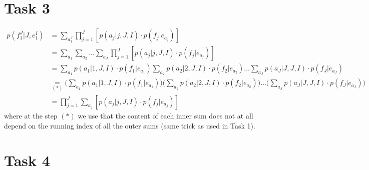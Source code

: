 \documentclass[%
   11pt,              %
   ngerman,           %
   a4paper,           %
   DIV11,             %
]{scrartcl}%
\begin{document}
\section*{Task 3}
\begin{align*}
	p(f_1^J|J,e_1^I)&=\sum_{a_1^J} \prod_{j=1}^J[p(a_j|j,J,I)\cdot p(f_j|e_{a_j})] \\
	&= \sum_{a_1}\sum_{a_2}\ldots \sum_{a_J} \prod_{j=1}^J[p(a_j|j,J,I)\cdot p(f_j|e_{a_j})] \\
	&= \sum_{a_1}p(a_1|1,J,I)\cdot p(f_1|e_{a_1}) \sum_{a_2}p(a_2|2,J,I)\cdot p(f_2|e_{a_2})\ldots \sum_{a_J} p(a_J|J,J,I)\cdot p(f_J|e_{a_J}) \\
	&\underset{(*)}{=} \bigg(\sum_{a_1}p(a_1|1,J,I)\cdot p(f_1|e_{a_1})\bigg)\bigg( \sum_{a_2}p(a_2|2,J,I)\cdot p(f_2|e_{a_2})\bigg)\ldots \bigg(\sum_{a_J} p(a_J|J,J,I)\cdot p(f_J|e_{a_J})\bigg) \\
	&= \prod_{j=1}^J \sum_{a_j} [p(a_j|j,J,I)\cdot p(f_j|e_{a_j})]
\end{align*}
where at the step $(*)$ we use that the content of each inner sum does not at all depend on the running index of all the outer sums (same trick as used in Task 1).
\section*{Task 4}
\end{document}
